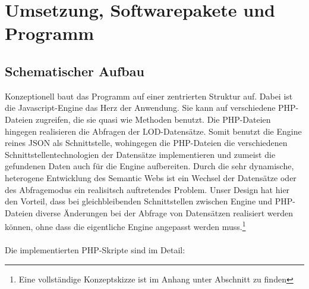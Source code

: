 \documentclass[a4paper, 11pt]{article}
\begin{document}
\section{Umsetzung, Softwarepakete und Programm}
\subsection{Schematischer Aufbau}
Konzeptionell baut das Programm auf einer zentrierten Struktur auf. Dabei ist die Javascript-Engine das Herz der Anwendung. Sie kann auf verschiedene PHP-Dateien zugreifen, die sie quasi wie Methoden benutzt. Die PHP-Dateien hingegen realisieren die Abfragen der LOD-Datensätze. Somit benutzt die Engine reines JSON als Schnittstelle, wohingegen die PHP-Dateien die verschiedenen Schnittstellentechnologien der Datensätze implementieren und zumeist die gefundenen Daten auch für die Engine aufbereiten. Durch die sehr dynamische, heterogene Entwicklung des Semantic Webs ist ein Wechsel der Datensätze oder des Abfragemodus ein realisitsch auftretendes Problem. Unser Design hat hier den Vorteil, dass bei gleichbleibenden Schnittstellen zwischen Engine und PHP-Dateien diverse Änderungen bei der Abfrage von Datensätzen realisiert werden können, ohne dass die eigentliche Engine angepasst werden muss.\footnote{Eine vollständige Konzeptskizze ist im Anhang unter Abschnitt \pageref{pic:Konzept} zu finden}\\\\
Die implementierten PHP-Skripte sind im Detail:
\end{document}
